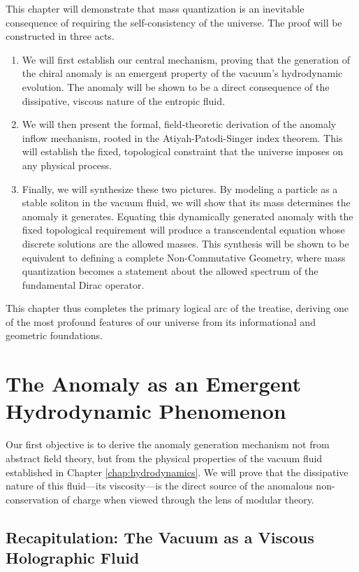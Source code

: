 \documentclass[11pt, letterpaper]{report}
\theoremstyle{plain} %
\theoremstyle{definition} %
\theoremstyle{remark} %
\begin{document}
This chapter will demonstrate that mass quantization is an inevitable consequence of requiring the self-consistency of the universe. The proof will be constructed in three acts.
\begin{enumerate}
    \item We will first establish our central mechanism, proving that the generation of the chiral anomaly is an emergent property of the vacuum's hydrodynamic evolution. The anomaly will be shown to be a direct consequence of the dissipative, viscous nature of the entropic fluid.
    \item We will then present the formal, field-theoretic derivation of the anomaly inflow mechanism, rooted in the Atiyah-Patodi-Singer index theorem. This will establish the fixed, topological constraint that the universe imposes on any physical process.
    \item Finally, we will synthesize these two pictures. By modeling a particle as a stable soliton in the vacuum fluid, we will show that its mass determines the anomaly it generates. Equating this dynamically generated anomaly with the fixed topological requirement will produce a transcendental equation whose discrete solutions are the allowed masses. This synthesis will be shown to be equivalent to defining a complete Non-Commutative Geometry, where mass quantization becomes a statement about the allowed spectrum of the fundamental Dirac operator.
\end{enumerate}
This chapter thus completes the primary logical arc of the treatise, deriving one of the most profound features of our universe from its informational and geometric foundations.

\section{The Anomaly as an Emergent Hydrodynamic Phenomenon}
\label{sec:anomaly_from_hydrodynamics}

Our first objective is to derive the anomaly generation mechanism not from abstract field theory, but from the physical properties of the vacuum fluid established in Chapter \ref{chap:hydrodynamics}. We will prove that the dissipative nature of this fluid—its viscosity—is the direct source of the anomalous non-conservation of charge when viewed through the lens of modular theory.

\subsection{Recapitulation: The Vacuum as a Viscous Holographic Fluid}
\label{subsec:recap_viscous_fluid}
\end{document}
